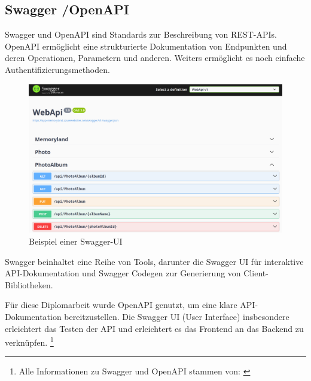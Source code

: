 \subsection{Swagger \slash OpenAPI}

Swagger und OpenAPI sind Standards zur Beschreibung von REST-APIs. OpenAPI ermöglicht 
eine strukturierte Dokumentation von Endpunkten und deren Operationen, Parametern und
anderen. Weiters ermöglicht es noch einfache Authentifizierungsmethoden.

\begin{figure} [h t]
    \centering
    \includegraphics[scale=0.15]{pics/swagger-ui-example.png}
    \caption{Beispiel einer Swagger-UI}
    \label{fig:swagger-ui-example}
\end{figure}

Swagger beinhaltet eine Reihe von Tools, darunter die Swagger UI für interaktive 
API-Dokumentation und Swagger Codegen zur Generierung von Client-Bibliotheken.

Für diese Diplomarbeit wurde OpenAPI genutzt, um eine klare API-Dokumentation bereitzustellen. 
Die Swagger UI (User Interface) insbesondere erleichtert das Testen der API und erleichtert 
es das Frontend an das Backend zu verknüpfen.
\footnote{Alle Informationen zu Swagger und OpenAPI stammen von: \cite{SmartBearSoftware}}

